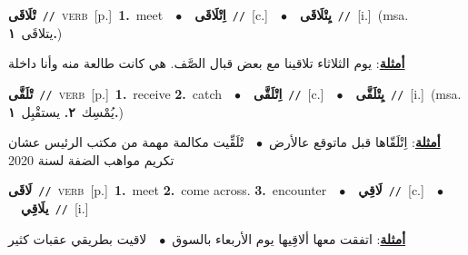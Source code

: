 \documentclass[10pt,a4paper,twoside]{article} %
\begin{document}
\begin{multicols}{2}
{\setlength\topsep{0pt}\textbf{\foreignlanguage{arabic}{تْلَاقَى}}\ {\color{gray}\texttt{//}\color{black}}\ \textsc{verb}\ [p.]\ \textbf{1.}~meet\ \ $\bullet$\ \ \setlength\topsep{0pt}\textbf{\foreignlanguage{arabic}{اِتْلَاقَى}}\ {\color{gray}\texttt{//}\color{black}}\ [c.]\ \ $\bullet$\ \ \setlength\topsep{0pt}\textbf{\foreignlanguage{arabic}{يِتْلَاقَى}}\ {\color{gray}\texttt{//}\color{black}}\ [i.]\ \color{gray}(msa. \foreignlanguage{arabic}{يتلاقَى}~\foreignlanguage{arabic}{\textbf{١.}})\color{black}\  \begin{flushright}\color{gray}\foreignlanguage{arabic}{\textbf{\underline{\foreignlanguage{arabic}{أمثلة}}}: يوم الثلاثاء تلاقينا مع بعض قبال الصَّف. هي كانت طالعة منه وأنا داخلة}\end{flushright}\color{black}} \vspace{2mm}

{\setlength\topsep{0pt}\textbf{\foreignlanguage{arabic}{تْلَقَّى}}\ {\color{gray}\texttt{//}\color{black}}\ \textsc{verb}\ [p.]\ \textbf{1.}~receive  \textbf{2.}~catch\ \ $\bullet$\ \ \setlength\topsep{0pt}\textbf{\foreignlanguage{arabic}{اِتْلَقَّى}}\ {\color{gray}\texttt{//}\color{black}}\ [c.]\ \ $\bullet$\ \ \setlength\topsep{0pt}\textbf{\foreignlanguage{arabic}{يِتْلَقَّى}}\ {\color{gray}\texttt{//}\color{black}}\ [i.]\ \color{gray}(msa. \foreignlanguage{arabic}{يُمْسِك}~\foreignlanguage{arabic}{\textbf{٢.}}  \foreignlanguage{arabic}{يستقْبِل}~\foreignlanguage{arabic}{\textbf{١.}})\color{black}\  \begin{flushright}\color{gray}\foreignlanguage{arabic}{\textbf{\underline{\foreignlanguage{arabic}{أمثلة}}}: اِتْلَقّاها قبل ماتوقع عالأرض\ $\bullet$\ \  تْلَقِّيت مكالمة مهمة من مكتب الرئيس عشان تكريم مواهب الضفة لسنة 2020}\end{flushright}\color{black}} \vspace{2mm}

{\setlength\topsep{0pt}\textbf{\foreignlanguage{arabic}{لَاقَى}}\ {\color{gray}\texttt{//}\color{black}}\ \textsc{verb}\ [p.]\ \textbf{1.}~meet  \textbf{2.}~come across.  \textbf{3.}~encounter\ \ $\bullet$\ \ \setlength\topsep{0pt}\textbf{\foreignlanguage{arabic}{لَاقِي}}\ {\color{gray}\texttt{//}\color{black}}\ [c.]\ \ $\bullet$\ \ \setlength\topsep{0pt}\textbf{\foreignlanguage{arabic}{يلَاقِي}}\ {\color{gray}\texttt{//}\color{black}}\ [i.]\  \begin{flushright}\color{gray}\foreignlanguage{arabic}{\textbf{\underline{\foreignlanguage{arabic}{أمثلة}}}: اتفقت معها ألاقِيها يوم الأربعاء بالسوق\ $\bullet$\ \  لاقيت بطريقي عقبات كثير}\end{flushright}\color{black}} \vspace{2mm}


\end{multicols}
\end{document}
